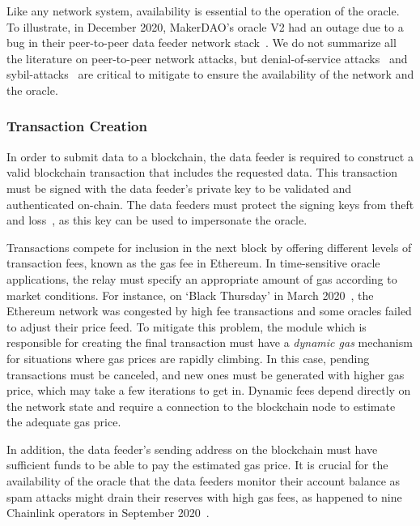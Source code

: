 Like any network system, availability is essential to the operation of the oracle. To illustrate, in December 2020, MakerDAO's oracle V2 had an outage due to a bug in their peer-to-peer data feeder network stack~\cite{makerdaooutage}. We do not summarize all the literature on peer-to-peer network attacks, but denial-of-service attacks~\cite{wood2002denial} and sybil-attacks~\cite{douceur2002sybil} are critical to mitigate to ensure the availability of the network and the oracle.


\subsubsection{Transaction Creation}\label{transaction_creation}

In order to submit data to a blockchain, the data feeder is required to construct a valid blockchain transaction that includes the requested data. This transaction must be signed with the data feeder's private key to be validated and authenticated on-chain. The data feeders must protect the signing keys from theft and loss~\cite{EBSC15}, as this key can be used to impersonate the oracle. %

Transactions compete for inclusion in the next block by offering different levels of transaction fees, known as the gas fee in Ethereum. In time-sensitive oracle applications, the relay must specify an appropriate amount of gas according to market conditions. For instance, on `Black Thursday' in March 2020~\cite{blackthursdayMaker}, the Ethereum network was congested by high fee transactions and some oracles failed to adjust their price feed. To mitigate this problem, the module which is responsible for creating the final transaction must have a \textit{dynamic gas} mechanism for situations where gas prices are rapidly climbing. In this case, pending transactions must be canceled, and new ones must be generated with higher gas price, which may take a few iterations to get in. Dynamic fees depend directly on the network state and require a connection to the blockchain node to estimate the adequate gas price.

In addition, the data feeder's sending address on the blockchain must have sufficient funds to be able to pay the estimated gas price. It is crucial for the availability of the oracle that the data feeders monitor their account balance as spam attacks might drain their reserves with high gas fees, as happened to nine Chainlink operators in September 2020~\cite{chainlinkdosattack}.

